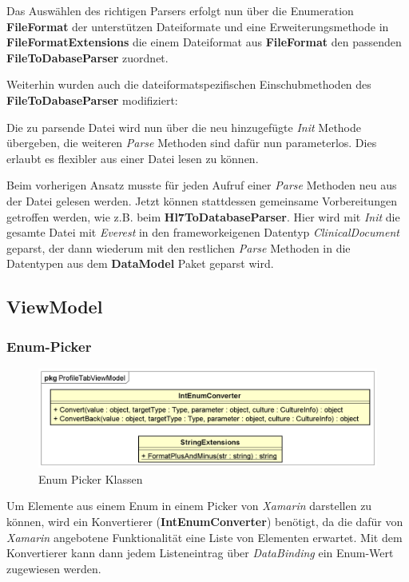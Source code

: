 \documentclass[a4paper]{scrreprt}
\begin{document}
Das Auswählen des richtigen Parsers erfolgt nun über die Enumeration \textbf{FileFormat} der unterstützen Dateiformate und eine Erweiterungsmethode in \textbf{FileFormatExtensions} die einem Dateiformat aus \textbf{FileFormat} den passenden \textbf{FileToDabaseParser} zuordnet.

Weiterhin wurden auch die dateiformatspezifischen Einschubmethoden des \textbf{FileToDabaseParser} modifiziert: 

Die zu parsende Datei wird nun über die neu hinzugefügte \textit{Init} Methode übergeben, die weiteren \textit{Parse} Methoden sind dafür nun parameterlos. Dies erlaubt es flexibler aus einer Datei lesen zu können. 

Beim vorherigen Ansatz musste für jeden Aufruf einer \textit{Parse} Methoden neu aus der Datei gelesen werden. Jetzt können stattdessen gemeinsame Vorbereitungen getroffen werden, wie z.B. beim \textbf{Hl7ToDatabaseParser}. Hier wird mit \textit{Init} die gesamte Datei mit \textit{Everest} in den frameworkeigenen Datentyp \textit{ClinicalDocument} geparst, der dann wiederum mit den restlichen \textit{Parse} Methoden in die Datentypen aus dem \textbf{DataModel} Paket geparst wird.

\subsection{ViewModel}
\subsubsection{Enum-Picker}
\begin{figure}[H]
\centering
\includegraphics[width=0.75\textheight]{graphics/Klassendiagramme/ViewModel/Enum-Picker.png}
\caption{Enum Picker Klassen}
\end{figure}
Um Elemente aus einem Enum in einem Picker von \textit{Xamarin} darstellen zu können, wird ein Konvertierer (\textbf{IntEnumConverter}) benötigt, da die dafür von \textit{Xamarin} angebotene Funktionalität eine Liste von Elementen erwartet. Mit dem Konvertierer kann dann jedem Listeneintrag über \textit{DataBinding} ein Enum-Wert zugewiesen werden.
\end{document}
